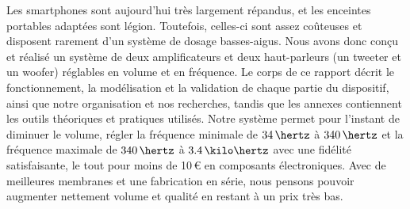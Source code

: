 {
%
%
    Les smartphones sont aujourd'hui très largement répandus,
    et les enceintes portables adaptées sont légion.
    Toutefois, celles-ci sont assez coûteuses et disposent rarement
    d'un système de dosage basses-aigus.
    Nous avons donc conçu et réalisé un système de deux amplificateurs
    et deux haut-parleurs (un tweeter et un woofer)
    réglables en volume et en fréquence.
    Le corps de ce rapport décrit le fonctionnement, la modélisation
    et la validation de chaque partie du dispositif,
    ainsi que notre organisation et nos recherches, tandis que
    les annexes contiennent les outils théoriques et pratiques utilisés.
    Notre système permet pour l'instant de diminuer le volume,
    régler
    la fréquence minimale de $34\,\hertz$ à $340\,\hertz$
    et la fréquence maximale de $340\,\hertz$ à $3.4\,\kilo\hertz$
    avec une fidélité satisfaisante, le tout pour moins de 10\,\euro{}
    en composants électroniques.
    Avec de meilleures membranes et une fabrication en série,
    nous pensons pouvoir augmenter nettement volume et qualité
    en restant à un prix très bas.
}
